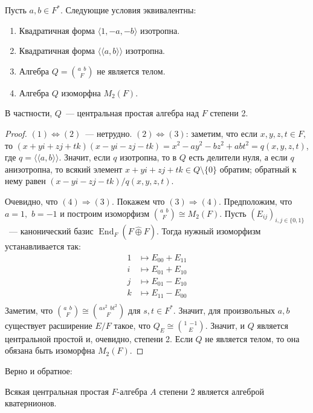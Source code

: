 \documentclass[a4paper,oneside,12pt]{article}
\theoremstyle{plain} { \swapnumbers
\newtheorem{theorem}{Теорема}[subsection]
\newtheorem{corollary}[theorem]{Следствие}
\newtheorem{lemma}[theorem]{Лемма}
\newtheorem{proposition}[theorem]{Утверждение}
\newtheorem{claim}[theorem]{Факт}
}
\theoremstyle{definition} { \swapnumbers
\newtheorem{definition}[theorem]{Определение}
\newtheorem{notation}[theorem]{Обозначение}
\newtheorem{remark}[theorem]{Замечание}
\newtheorem{remarks}[theorem]{Замечания}
\newtheorem{example}[theorem]{Пример}
\newtheorem{examples}[theorem]{Примеры}
\newtheorem{sssection}[theorem]{}
}
\def\End{\operatorname{End}}
\def\la{\langle}
\def\ra{\rangle}
\def\lla{\la\!\la}
\def\rra{\ra\!\ra}
\def\quaternion#1#2#3{\binom{{#1}\:\:{#2}}{#3}}
\begin{document}
\begin{theorem}\label{thm:quaternion_splitting}
Пусть $a,b\in F^*$. Следующие условия эквивалентны:
\begin{enumerate}
\item Квадратичная форма $\la 1,-a,-b\ra$ изотропна.
\item Квадратичная форма $\lla a,b\rra$ изотропна.
\item Алгебра $Q=\quaternion{a}{b}{F}$ не является телом.
\item Алгебра $Q$ изоморфна $M_2(F)$.
\end{enumerate}
В частности, $Q$~--- центральная простая алгебра над $F$ степени 2.
\end{theorem}
\begin{proof}
$(1)\Longleftrightarrow (2)$~--- нетрудно. %
$(2)\Longleftrightarrow (3)$: заметим, что если $x,y,z,t\in F$,
то $(x+yi+zj+tk)(x-yi-zj-tk)=x^2-ay^2-bz^2+abt^2=q(x,y,z,t)$, где $q=\lla a,b\rra$.
Значит, если $q$ изотропна, то в $Q$ есть делители нуля, а если $q$ анизотропна,
то всякий элемент $x+yi+zj+tk\in Q\setminus\{0\}$ обратим; обратный к нему равен
$(x-yi-zj-tk)/q(x,y,z,t)$.

Очевидно, что $(4)\Rightarrow(3)$. Покажем что $(3)\Rightarrow(4)$. Предположим,
что $a=1,$ $b=-1$ и построим изоморфизм $\quaternion{a}{b}{F}\cong M_2(F)$.
Пусть $(E_{ij})_{i,j\in\{0,1\}}$~--- канонический базис $\End_F(F\hat\oplus F)$.
Тогда нужный изоморфизм устанавливается так:
$$
\begin{aligned}
1&\mapsto E_{00}+E_{11}\\
i&\mapsto E_{01}+E_{10}\\
j&\mapsto E_{01}-E_{10}\\
k&\mapsto E_{11}-E_{00}\\
\end{aligned}
$$
Заметим, что $\quaternion{a}{b}{F}\cong\quaternion{as^2}{bt^2}{F}$ для $s,t\in F^*$. Значит, для произвольных
$a,b$ существует расширение $E/F$ такое, что $Q_E\cong\quaternion{1}{-1}{E}$. Значит, и $Q$
является центральной простой и, очевидно, степени 2. Если $Q$ не является телом, то она обязана быть
изоморфна $M_2(F)$.
\end{proof}
Верно и обратное:
\begin{theorem}
Всякая центральная простая $F$-алгебра $A$ степени 2 является алгеброй кватернионов.
\end{theorem}
\end{document}

